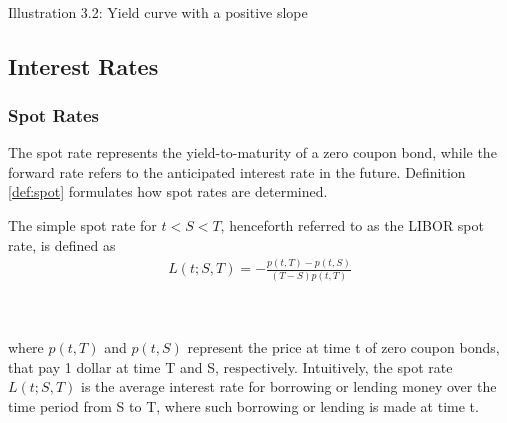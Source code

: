 \begin{center}
    \\[10pt] 
    Illustration 3.2: Yield curve with a positive slope
\end{center}
\subsection{Interest Rates}
\subsubsection{Spot Rates}
The spot rate represents the yield-to-maturity of a zero coupon bond,
while the forward rate refers to the anticipated interest rate in the 
future. Definition \ref{def:spot} formulates how spot rates are determined.
\begin{definition}\label{def:spot}
    The simple spot rate for $t<S<T$, henceforth referred to as the 
    LIBOR spot rate, is defined as \cite{Bjork} 
    \begin{align*}
        L(t;S,T) = - \frac{p(t,T)-p(t,S)}{(T-S)p(t,T)}
    \end{align*}
\end{definition} 
\noindent
\\\\
where $p(t,T)$ and $p(t,S)$ represent the price at time t of zero coupon bonds, that pay
1 dollar at time T and S, respectively. Intuitively, the spot rate $L(t;S,T)$ is the 
average interest rate for borrowing or lending money over the time period from S to T, 
where such borrowing or lending is made at time t. 

